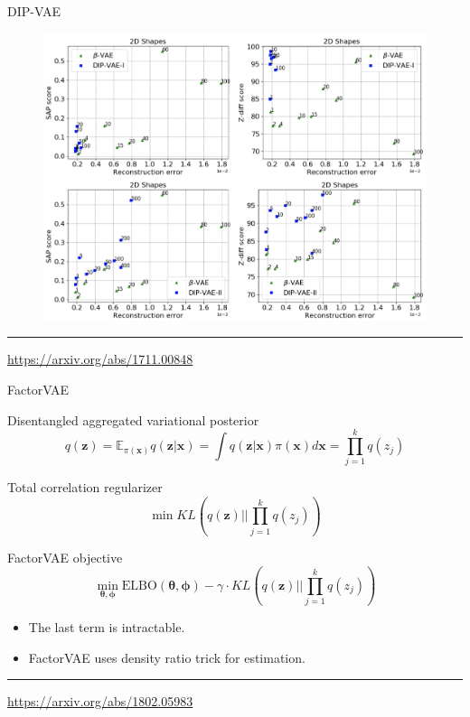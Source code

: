 \documentclass{beamer}
\newcommand{\bx}{\mathbf{x}}
\newcommand{\bz}{\mathbf{z}}
\newcommand{\bbE}{\mathbb{E}}
\newcommand{\btheta}{\boldsymbol{\theta}}
\newcommand{\bphi}{\boldsymbol{\phi}}
\begin{document}
\begin{frame}{DIP-VAE}
	\begin{figure}
		\centering
		\includegraphics[width=0.95\linewidth]{figs/dip-vae_2}
	\end{figure}
	\vfill
	\hrule\medskip
	{\scriptsize \href{https://arxiv.org/abs/1711.00848}{https://arxiv.org/abs/1711.00848}}
\end{frame}
\begin{frame}{FactorVAE}
	\begin{block}{Disentangled aggregated variational posterior}
		\vspace{-0.3cm}
		\[
		q(\bz) = \bbE_{\pi(\bx)} q(\bz | \bx) = \int q(\bz | \bx) \pi(\bx) d\bx = \prod_{j=1}^k q(z_j)
		\]
		\vspace{-0.3cm}
	\end{block}
	\begin{block}{Total correlation regularizer}
		\vspace{-0.3cm}
		\[
		\min KL(q(\bz) || \prod_{j=1}^k q(z_j))
		\]
		\vspace{-0.3cm}
	\end{block}
	\begin{block}{FactorVAE objective}
		\vspace{-0.3cm}
		\[
		\min_{\btheta, \bphi} \text{ELBO}(\btheta, \bphi) - \gamma \cdot KL(q(\bz) || \prod_{j=1}^k q(z_j))
		\]
		\vspace{-0.3cm}
	\end{block}
	\begin{itemize}
		\item The last term is intractable.
		\item FactorVAE uses density ratio trick for estimation. 
	\end{itemize}
	\vspace{0.3cm}

	\vfill
	\hrule\medskip
	{\scriptsize \href{https://arxiv.org/abs/1802.05983}{https://arxiv.org/abs/1802.05983}}
\end{frame}
\end{document}
